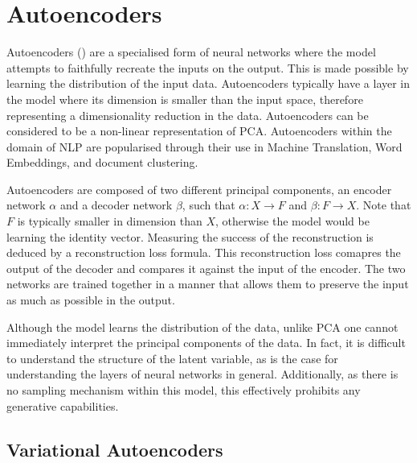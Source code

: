 \documentclass[12pt,twoside]{report}
\begin{document}
\section{Autoencoders}
\label{autoencoders}
Autoencoders (\cite{e._rumelhart_learning_1986}) are a specialised form of neural networks where the model attempts to faithfully recreate the inputs on the output. This is made possible by learning the distribution of the input data. Autoencoders typically have a layer in the model where its dimension is smaller than the input space, therefore representing a dimensionality reduction in the data. Autoencoders can be considered to be a non-linear representation of PCA. Autoencoders within the domain of NLP are popularised through their use in Machine Translation, Word Embeddings, and document clustering. 

Autoencoders are composed of two different principal components, an encoder network $\alpha$ and a decoder network $\beta$, such that $\alpha : X \rightarrow F$ and $\beta : F \rightarrow X$. Note that $F$ is typically smaller in dimension than $X$, otherwise the model would be learning the identity vector.  Measuring the success of the reconstruction is deduced by a reconstruction loss formula. This reconstruction loss comapres the output of the decoder and compares it against the input of the encoder. The two networks are trained together in a manner that allows them to preserve the input as much as possible in the output.


Although the model learns the distribution of the data, unlike PCA one cannot immediately interpret the principal components of the data. In fact, it is difficult to understand the structure of the latent variable, as is the case for understanding the layers of neural networks in general. Additionally, as there is no sampling mechanism within this model, this effectively prohibits any generative capabilities. 

\subsection{Variational Autoencoders}
\label{variational_autoencoders}

\end{document}
